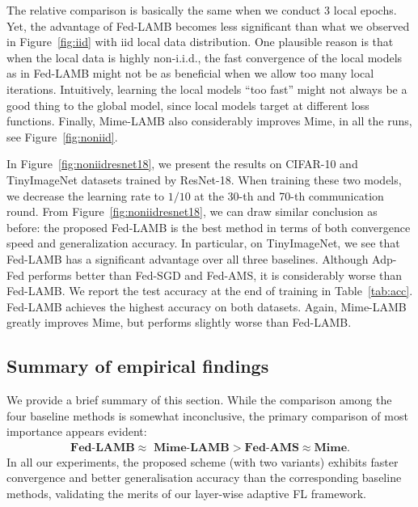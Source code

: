 \documentclass[nohyperref]{article}
\theoremstyle{plain}
\theoremstyle{definition}
\theoremstyle{remark}
\begin{document}
The relative comparison is basically the same when we conduct 3 local epochs. Yet, the advantage of Fed-LAMB becomes less significant than what we observed in Figure~\ref{fig:iid} with iid local data distribution. One plausible reason is that when the local data is highly non-i.i.d., the fast convergence of the local models as in Fed-LAMB might not be as beneficial when we allow too many local iterations. 
Intuitively, learning the local models ``too fast'' might not always be a good thing to the global model, since local models target at different loss functions.
Finally, Mime-LAMB also considerably improves Mime, in all the runs, see Figure~\ref{fig:noniid}.





In Figure~\ref{fig:noniidresnet18}, we present the results on CIFAR-10 and TinyImageNet datasets trained by ResNet-18. When training these two models, we decrease the learning rate to $1/10$ at the 30-th and 70-th communication round. From Figure~\ref{fig:noniidresnet18}, we can draw similar conclusion as before: the proposed Fed-LAMB is the best method in terms of both convergence speed and generalization accuracy. In particular, on TinyImageNet, we see that Fed-LAMB has a significant advantage over all three baselines. Although Adp-Fed performs better than Fed-SGD and Fed-AMS, it is considerably worse than Fed-LAMB. We report the test accuracy at the end of training in Table~\ref{tab:acc}. Fed-LAMB achieves the highest accuracy on both datasets. Again, Mime-LAMB greatly improves Mime, but performs slightly worse than Fed-LAMB.

\subsection{Summary of empirical findings}

We provide a brief summary of this section. While the comparison among the four baseline methods is somewhat inconclusive, the primary comparison of most importance appears evident:
\begin{align*}
    \textbf{Fed-LAMB$\approx$ Mime-LAMB$>$Fed-AMS$\approx$Mime.} 
\end{align*}
In all our experiments, the proposed scheme (with two variants) exhibits faster convergence and better generalisation accuracy than the corresponding baseline methods, validating the merits of our layer-wise adaptive FL framework.


\end{document}
